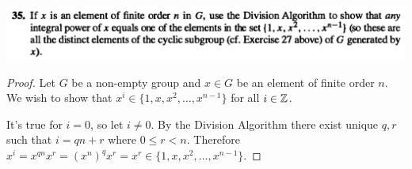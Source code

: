 ~\\~\\
\begin{mdframed}
\includegraphics[width=400pt]{img/algebra--nf--1--problem-set-1-7561.png}
\end{mdframed}

\begin{proof}
  Let $G$ be a non-empty group and $x \in G$ be an element of finite order $n$. We wish to show
  that $x^i \in \{1, x, x^2, \ldots, x^{n-1}\}$ for all $i \in \mathbb{Z}$.

  It's true for $i = 0$, so let $i \neq 0$. By the Division Algorithm there exist unique $q, r$ such
  that $i = qn + r$ where $0 \leq r < n$.
  Therefore $x^i = x^{qn}x^r = (x^n)^qx^r = x^r \in \{1, x, x^2, \ldots, x^{n-1}\}$.
\end{proof}